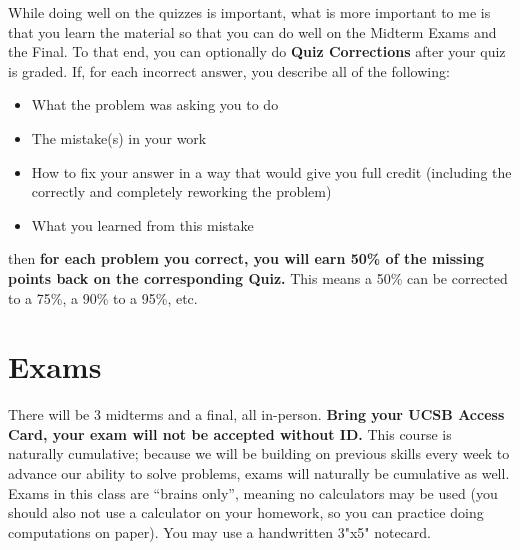 \documentclass[11pt,letterpaper]{article}
\begin{document}
While doing well on the quizzes is important, what is more important to me is that you learn the material so that you can do well on the Midterm Exams and the Final. To that end, you can optionally do \textbf{Quiz Corrections} after your quiz is graded. If, for each incorrect answer, you describe all of the following:
\begin{itemize}[nosep]
\item What the problem was asking you to do
\item The mistake(s) in your work
\item How to fix your answer in a way that would give you full credit (including the correctly and completely reworking the problem)
\item What you learned from this mistake
\end{itemize}
then \textbf{for each problem you correct, you will earn 50\% of the missing points back on the corresponding Quiz. }This means a 50\% can be corrected to a 75\%, a 90\% to a 95\%, etc.

\section*{Exams}
There will be 3 midterms and a final, all in-person. \textbf{Bring your UCSB Access Card, your exam will not be accepted without ID.} This course is naturally cumulative; because we will be building on previous skills every week to advance our ability to solve problems, exams will naturally be cumulative as well. Exams in this class are “brains only”, meaning no calculators may be used (you should also not use a calculator on your homework, so you can practice doing computations on paper). You may use a handwritten 3"x5" notecard.
\end{document}
